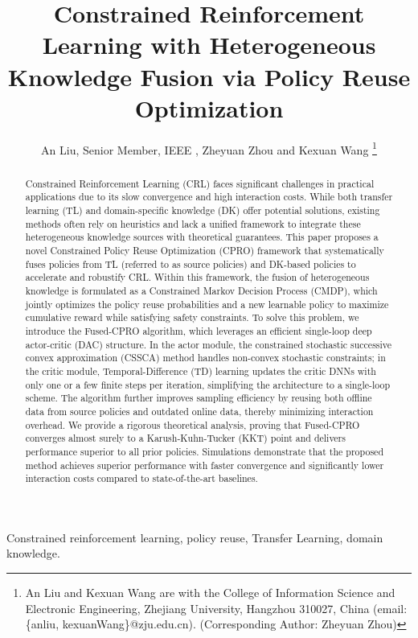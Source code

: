 \documentclass{IEEEtran}
\begin{document}
\title{Constrained Reinforcement Learning with Heterogeneous Knowledge Fusion via Policy Reuse Optimization}
\author{An Liu, Senior Member, IEEE , Zheyuan Zhou and Kexuan Wang \thanks{An Liu and Kexuan Wang are with the College of Information Science and Electronic Engineering, Zhejiang University, Hangzhou 310027, China (email: \{anliu, kexuanWang\}@zju.edu.cn). (Corresponding Author: Zheyuan Zhou)}}
\maketitle
\begin{abstract}
Constrained Reinforcement Learning (CRL) faces significant challenges in practical applications due to its slow convergence and high interaction costs. While both transfer learning (TL) and domain-specific knowledge (DK) offer potential solutions, existing methods often rely on heuristics and lack a unified framework to integrate these heterogeneous knowledge sources with theoretical guarantees. This paper proposes a novel Constrained Policy Reuse Optimization (CPRO) framework that systematically fuses policies from TL (referred to as source policies) and DK-based policies to accelerate and robustify CRL. Within this framework, the fusion of heterogeneous knowledge is formulated as a Constrained Markov Decision Process (CMDP), which jointly optimizes the policy reuse probabilities and a new learnable policy to maximize cumulative reward while satisfying safety constraints. To solve this problem, we introduce the Fused-CPRO algorithm, which leverages an efficient single-loop deep actor-critic (DAC) structure. In the actor module, the constrained stochastic successive convex approximation (CSSCA) method handles non-convex stochastic constraints; in the critic module, Temporal-Difference (TD) learning updates the critic DNNs with only one or a few finite steps per iteration, simplifying the architecture to a single-loop scheme. The algorithm further improves sampling efficiency by reusing both offline data from source policies and outdated online data, thereby minimizing interaction overhead. We provide a rigorous theoretical analysis, proving that Fused-CPRO converges almost surely to a Karush-Kuhn-Tucker (KKT) point and delivers performance superior to all prior policies. Simulations demonstrate that the proposed method achieves superior performance with faster convergence and significantly lower interaction costs compared to state-of-the-art baselines.
\end{abstract}
\begin{IEEEkeywords}
Constrained reinforcement learning, policy reuse, Transfer Learning, domain knowledge.
\end{IEEEkeywords}
\end{document}
